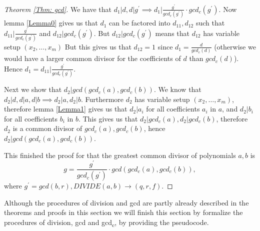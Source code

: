 \begin{proof}[Theorem \ref{Thm: gcd}]
  We have that $d_1|d, d|g^\prime \implies d_1\Big|\frac{g^\prime}{gcd_c(g^\prime)}\cdot gcd_c(g^\prime)$. Now lemma \ref{Lemma0} gives us that $d_1$ can be factored into $d_{11},d_{12}$ such that $d_{11}\Big|\frac{g^\prime}{gcd_c(g^\prime)}$ and $d_{12}|gcd_c(g^\prime)$. But $d_{12}|gcd_c(g^\prime)$ means that $d_{12}$ has variable setup $(x_2,\ldots,x_m)$ But this gives us that $d_{12}=1$ since $d_1=\frac{d}{gcd_c(d)}$ (otherwise we would have a larger common divisor for the coefficients of $d$ than $gcd_c(d)$). Hence $d_1=d_{11}\Big|\frac{g^\prime}{gcd_c(g^\prime)}$.

  Next we show that $d_2|gcd(gcd_c(a),gcd_c(b))$. We know that $d_2|d, d|a, d|b \implies d_2|a, d_2|b$. Furthermore $d_2$ has variable setup $(x_2,\ldots,x_m)$, therefore lemma \ref{Lemma1} gives us that $d_2|a_i$ for all coefficients $a_i$ in $a$, and $d_2|b_i$ for all coefficients $b_i$ in $b$. This gives us that $d_2|gcd_c(a), d_2|gcd_c(b)$, therefore $d_2$ is a common divisor of $gcd_c(a),gcd_c(b)$, hence $d_2|gcd(gcd_c(a),gcd_c(b))$.

  This finished the proof for that the greatest common divisor of polynomials $a,b$ is
  \begin{equation}
    g=\frac{g^\prime}{gcd_c(g^\prime)}\cdot gcd(gcd_c(a),gcd_c(b)),
  \end{equation}
  where $g^\prime=gcd(b,r), DIVIDE(a,b) \rightarrow (q,r,f)$.
\end{proof}
Although the procedures of division and gcd are partly already described in the theorems and proofs in this section we will finish this section by formalize the procedures of division, gcd and gcd\textsubscript{c}, by providing the pseudocode.

